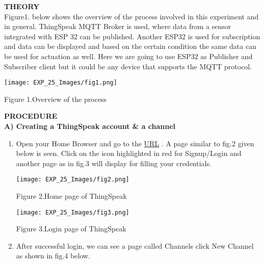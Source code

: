 \documentclass[12pt,a4paper]{article}
\begin{document}
\begin{justify}
\textbf{\large THEORY}\\[3pt]
Figure1. below shows the overview of the process involved in this experiment and in general. ThingSpeak MQTT Broker is used, where data from a sensor integrated with ESP 32 can be published. Another ESP32 is used for subscription and data can be displayed and based on the certain condition the same data can be used for actuation as well. Here we are going to use ESP32 as Publisher and Subscriber client but it could be any device that supports the MQTT protocol.


\begin{center} 
\texttt{[image: EXP\_25\_Images/fig1.png]}
\end{center}
\vspace{-10mm}
\begin{center} {Figure 1.Overview of the process}\end{center}



\noindent \textbf{\large PROCEDURE}\\[6pt]
\textbf{A)	Creating a ThingSpeak account \& a channel}\\
\vspace{-10mm}
\begin{enumerate}
 \setlength\itemsep{-0.3em}
\item  Open your Home Browser and go to the \href{https://thingspeak.com/}{URL} . A page similar to fig.2 given below is seen. Click on the icon highlighted in red for Signup/Login and another page as in fig.3 will display for filling your credentials.
\vspace{-5mm}
\begin{center} 
\texttt{[image: EXP\_25\_Images/fig2.png]}
\end{center}
\vspace{-10mm}
\begin{center} {Figure 2.Home page of ThingSpeak}\end{center}

\begin{center} 
\texttt{[image: EXP\_25\_Images/fig3.png]}
\end{center}
\vspace{-10mm}
\begin{center} {Figure 3.Login page of ThingSpeak}\end{center}

\item  After successful login, we can see a page called Channels click New Channel as shown in fig.4 below.


\end{enumerate}
\end{justify}
\end{document}
